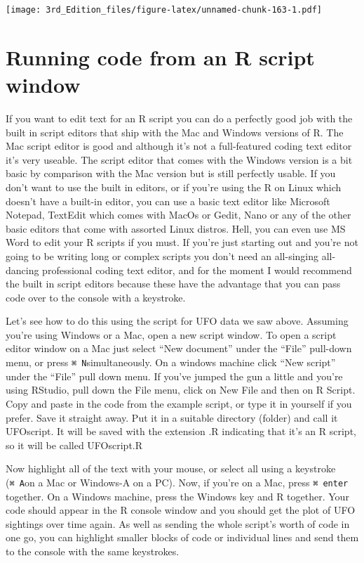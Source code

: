 \documentclass[
]{book}
\begin{document}
\texttt{[image: 3rd\_Edition\_files/figure-latex/unnamed-chunk-163-1.pdf]}

\hypertarget{running-code-from-an-r-script-window}{%
\section{Running code from an R script window}\label{running-code-from-an-r-script-window}}

If you want to edit text for an R script you can do a perfectly good job with the built in script editors that ship with the Mac and Windows versions of R. The Mac script editor is good and although it's not a full-featured coding text editor it's very useable. The script editor that comes with the Windows version is a bit basic by comparison with the Mac version but is still perfectly usable. If you don't want to use the built in editors, or if you're using the R on Linux which doesn't have a built-in editor, you can use a basic text editor like Microsoft Notepad, TextEdit which comes with MacOs or Gedit, Nano or any of the other basic editors that come with assorted Linux distros. Hell, you can even use MS Word to edit your R scripts if you must. If you're just starting out and you're not going to be writing long or complex scripts you don't need an all-singing all-dancing professional coding text editor, and for the moment I would recommend the built in script editors because these have the advantage that you can pass code over to the console with a keystroke.

Let's see how to do this using the script for UFO data we saw above. Assuming you're using Windows or a Mac, open a new script window. To open a script editor window on a Mac just select ``New document'' under the ``File'' pull-down menu, or press \texttt{⌘\ N}simultaneously. On a windows machine click ``New script'' under the ``File'' pull down menu. If you've jumped the gun a little and you're using RStudio, pull down the File menu, click on New File and then on R Script. Copy and paste in the code from the example script, or type it in yourself if you prefer. Save it straight away. Put it in a suitable directory (folder) and call it UFOscript. It will be saved with the extension .R indicating that it's an R script, so it will be called UFOscript.R

Now highlight all of the text with your mouse, or select all using a keystroke (\texttt{⌘\ A}on a Mac or Windows-A on a PC). Now, if you're on a Mac, press \texttt{⌘\ enter} together. On a Windows machine, press the Windows key and R together. Your code should appear in the R console window and you should get the plot of UFO sightings over time again. As well as sending the whole script's worth of code in one go, you can highlight smaller blocks of code or individual lines and send them to the console with the same keystrokes.
\end{document}
